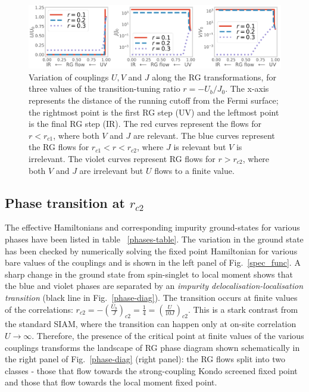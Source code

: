 \documentclass{iopart}
\begin{document}
\begin{figure}[!htbp]
\centering
\includegraphics[width=\textwidth]{rg-flows-all.pdf}
\caption{Variation of couplings \(U,V\) and \(J\) along the RG transformations, for three values of the transition-tuning ratio \(r = -U_b/J_0\). The x-axis represents the distance of the running cutoff from the Fermi surface; the rightmost point is the first RG step (UV) and the leftmost point is the final RG step (IR). The red curves represent the flows for \(r < r_{c1}\), where both \(V\) and \(J\) are relevant. The blue curves represent the RG flows for \(r_{c1} < r < r_{c2}\), where \(J\) is relevant but \(V\) is irrelevant. The violet curves represent RG flows for \(r > r_{c2}\), where both \(V\) and \(J\) are irrelevant but \(U\) flows to a finite value.}
\label{rg-flow}
\end{figure}

\subsection{Phase transition at \(r_{c2}\)}
The effective Hamiltonians and corresponding impurity ground-states for various phases have been listed in table ~\eqref{phases-table}. The variation in the ground state has been checked by numerically solving the fixed point Hamiltonian for various bare values of the couplings and is shown in the left panel of Fig.~\eqref{spec_func}.
A sharp change in the ground state from spin-singlet to local moment shows that the blue and violet phases are separated by an {\it impurity delocalisation-localisation transition} (black line in Fig.~\eqref{phase-diag}). The transition occurs at finite values of the correlations: \(r_{c2} = -\left(\frac{U_b}{J}\right)_{c2} = \frac{1}{4} = \left(\frac{U}{10 J}\right)_{c2}\). This is a stark contrast from the standard SIAM, where the transition can happen only at on-site correlation \(U \to\infty\). Therefore, the presence of the critical point at finite values of the various couplings transforms the landscape of RG phase diagram shown schematically in the right panel of Fig.~\eqref{phase-diag} (right panel): the RG flows split into two classes - those that flow towards the strong-coupling Kondo screened fixed point and those that flow towards the local moment fixed point.
\end{document}
